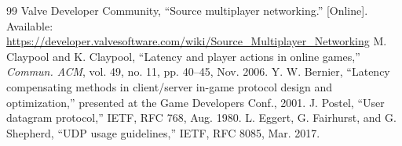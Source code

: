 \IfFileExists{IEEEtran.cls}{\ieeetrue\documentclass[conference]{IEEEtran}}{\ieeefalse\documentclass[twocolumn,10pt]{article}}
\begin{document}
\begin{thebibliography}{99}
 Valve Developer Community, ``Source multiplayer networking.'' [Online]. Available: \url{https://developer.valvesoftware.com/wiki/Source_Multiplayer_Networking}
 M. Claypool and K. Claypool, ``Latency and player actions in online games,'' \emph{Commun. ACM}, vol. 49, no. 11, pp. 40--45, Nov. 2006.
 Y. W. Bernier, ``Latency compensating methods in client/server in-game protocol design and optimization,'' presented at the Game Developers Conf., 2001.
 J. Postel, ``User datagram protocol,'' IETF, RFC 768, Aug. 1980.
 L. Eggert, G. Fairhurst, and G. Shepherd, ``UDP usage guidelines,'' IETF, RFC 8085, Mar. 2017.
\end{thebibliography}
\end{document}
